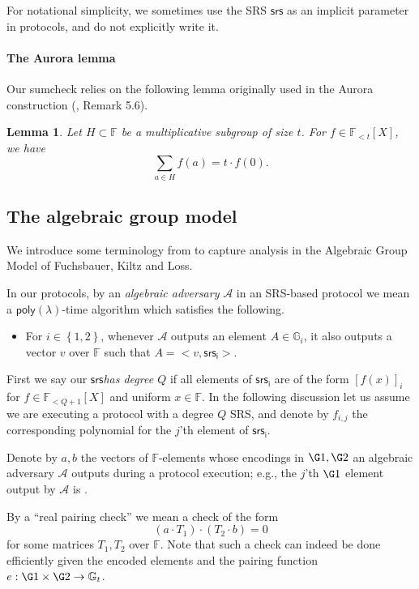 \documentclass[11pt]{article} %
\newcommand{\Gi}{\ensuremath{{\mathbb G}_i}\xspace}
\newcommand{\Gt}{\ensuremath{{\mathbb G}_t}\xspace}
\newcommand{\F}{\ensuremath{\mathbb F}\xspace}
\newcommand{\adv}{\ensuremath{\mathcal A}\xspace}
\newcommand{\srs}{\ensuremath{\mathsf{srs}}\xspace}
\newcommand{\srsi}{\ensuremath{\mathsf{srs_i}}\xspace}
\newcommand{\enci}[1]{\ensuremath{\left[#1\right]_i}\xspace}
\newcommand{\set}[1]{\ensuremath{\left\{#1\right\}}\xspace}
\newcommand{\polysofdeg}[1]{\ensuremath{\F_{< #1}[X]}\xspace}
\newtheorem{lemma}{Lemma}[section]
\newcommand{\poly}{\ensuremath{\mathsf{poly(\lambda)}}\xspace}
\begin{document}
For notational simplicity, we sometimes use the SRS \srs as an implicit parameter in protocols, and do not explicitly write it.


\paragraph{The Aurora lemma}
Our sumcheck relies on the following lemma originally used in the Aurora construction (\cite{aurora}, Remark 5.6).
\begin{lemma}\label{lem:aurora}
 Let $H\subset \F$ be a multiplicative subgroup of size $t$.
 For $f\in\polysofdeg{t}$, we have 
\[\sum_{a\in H}f(a) = t\cdot f(0).\]
\end{lemma}



\subsection{The algebraic group model}\label{subsec:agm}
We introduce some terminology from \cite{plonk} to capture analysis in the Algebraic Group Model of Fuchsbauer, Kiltz and Loss\cite{AGM}.

In our protocols, by an \emph{algebraic adversary} \adv in an SRS-based protocol we mean a \poly-time algorithm which satisfies the following.
\begin{itemize}
 \item For $i\in \set{1,2}$, whenever \adv outputs an element $A\in \Gi$, it also outputs a vector $v$ over \F such that $A = <v,\srsi>$.
\end{itemize}

First we say our \srs \emph{has degree $Q$} if all elements of \srsi are of the form  \enci{f(x)} for $f\in \polysofdeg{Q+1}$ and uniform $x\in \F$. In the following discussion let us assume we are executing a protocol with a degree $Q$ SRS, and denote by $f_{i,j}$ the corresponding polynomial for the $j$'th element of \srsi.

Denote by $a,b$ the vectors of $\F$-elements whose encodings in $\G1,\G2$ an algebraic adversary \adv outputs during a protocol execution; e.g., the $j$'th $\G1$ element output by \adv is .

By a ``real pairing check'' we mean a check of the form
\[(a\cdot T_1) \cdot (T_2\cdot b)=0\]
for some matrices $T_1,T_2$ over $\F$.
Note that such a check can indeed be done efficiently given the encoded elements and the pairing function $e:\G1\times \G2\to \Gt$.
\end{document}
